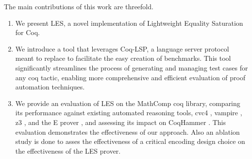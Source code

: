 The main contributions of this work are threefold. 
\begin{enumerate}
    \item We present LES, a novel implementation of Lightweight Equality Saturation for Coq.
    \item We introduce a tool that leverages Coq-LSP, a language server protocol meant to replace \cite{serapi} to facilitate the easy creation of benchmarks. 
    This tool significantly streamlines the process of generating and managing test cases for any coq tactic, enabling more comprehensive and efficient evaluation of proof automation techniques.
    \item We provide an evaluation of LES on the MathComp coq library, comparing its performance against existing automated reasoning tools, cvc4 \cite{cvc4}, vampire \cite{vampire}, z3 \cite{z3}, and the E prover \cite{eprover}, and assessing its impact on CoqHammer \cite{coqhammer}. 
    This evaluation demonstrates the effectiveness of our approach. Also an ablation study is done to asses the effectiveness of a critical encoding design choice on the effectiveness of the LES prover.
\end{enumerate}  

